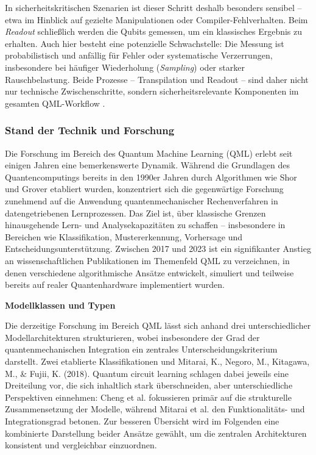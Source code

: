 In sicherheitskritischen Szenarien ist dieser Schritt deshalb besonders sensibel – etwa im Hinblick auf gezielte Manipulationen oder Compiler-Fehlverhalten. Beim \textit{Readout} schließlich werden die Qubits gemessen, um ein klassisches Ergebnis zu erhalten. Auch hier besteht eine potenzielle Schwachstelle: Die Messung ist probabilistisch und anfällig für Fehler oder systematische Verzerrungen, insbesondere bei häufiger Wiederholung (\textit{Sampling}) oder starker Rauschbelastung. Beide Prozesse – Transpilation und Readout – sind daher nicht nur technische Zwischenschritte, sondern sicherheitsrelevante Komponenten im gesamten QML-Workflow \cite{willeIBMsQiskitTool2019}.

\vspace{0.5cm}


\subsubsection{Stand der Technik und Forschung}
\noindent
Die Forschung im Bereich des Quantum Machine Learning (QML) erlebt seit einigen Jahren eine bemerkenswerte Dynamik. Während die Grundlagen des Quantencomputings bereits in den 1990er Jahren durch Algorithmen wie Shor und Grover etabliert wurden, konzentriert sich die gegenwärtige Forschung zunehmend auf die Anwendung quantenmechanischer Rechenverfahren in datengetriebenen Lernprozessen. Das Ziel ist, über klassische Grenzen hinausgehende Lern- und Analysekapazitäten zu schaffen – insbesondere in Bereichen wie Klassifikation, Mustererkennung, Vorhersage und Entscheidungsunterstützung. Zwischen 2017 und 2023 ist ein signifikanter Anstieg an wissenschaftlichen Publikationen im Themenfeld QML zu verzeichnen, in denen verschiedene algorithmische Ansätze entwickelt, simuliert und teilweise bereits auf realer Quantenhardware implementiert wurden. \cite{peral-garciaSystematicLiteratureReview2024}

\vspace{1em}
\noindent\textbf{Modellklassen und Typen}

\noindent
Die derzeitige Forschung im Bereich QML lässt sich anhand drei unterschiedlicher Modellarchitekturen strukturieren, wobei insbesondere der Grad der quantenmechanischen Integration ein zentrales Unterscheidungskriterium darstellt. Zwei etablierte Klassifikationen \cite{chengNoisyIntermediatescaleQuantum2023} und Mitarai, K., Negoro, M., Kitagawa, M., & Fujii, K. (2018). Quantum circuit learning 
schlagen dabei jeweils eine Dreiteilung vor, die sich inhaltlich stark überschneiden, aber unterschiedliche Perspektiven einnehmen: Cheng et al. fokussieren primär auf die strukturelle Zusammensetzung der Modelle, während Mitarai et al. den Funktionalitäts- und Integrationsgrad betonen.
Zur besseren Übersicht wird im Folgenden eine kombinierte Darstellung beider Ansätze gewählt, um die zentralen Architekturen konsistent und vergleichbar einzuordnen. 

